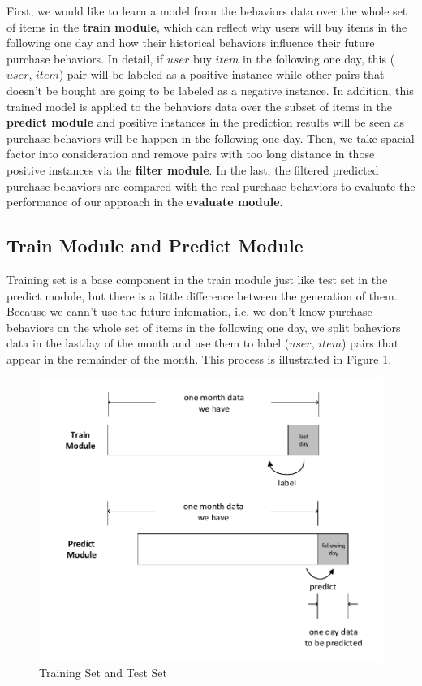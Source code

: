 \documentclass{llncs}
\begin{document}
First, we would like to learn a model from
the behaviors data over the whole set of items in the \textbf{train module},
which can reflect why users will buy items in the following one day
and how their historical behaviors influence their future purchase behaviors.
In detail, if $user$ buy $item$ in the following one day,
this ($user$, $item$) pair will be labeled as a positive instance
while other pairs that doesn't be bought
are going to be labeled as a negative instance.
In addition, this trained model is applied to the behaviors data over
the subset of items in the \textbf{predict module}
and positive instances in the prediction results will be seen as
purchase behaviors will be happen in the following one day.
Then, we take spacial factor into consideration and remove pairs
with too long distance in those positive instances
via the \textbf{filter module}.
In the last, the filtered predicted purchase behaviors are
compared with the real purchase behaviors to evaluate
the performance of our approach in the \textbf{evaluate module}.

\subsection{Train Module and Predict Module}
Training set is a base component in the train module just like
test set in the predict module,
but there is a little difference between the generation of them.
Because we cann't use the future infomation,
i.e. we don't know purchase behaviors
on the whole set of items in the following one day,
we split baheviors data in the lastday of the month
and use them to label ($user$, $item$) pairs that appear
in the remainder of the month.
This process is illustrated in Figure \ref{fig:train_and_test}.

\begin{figure}[htbp]
	\centering
	\includegraphics[scale=0.6]{images/train_and_test.pdf}
	\caption{Training Set and Test Set}
	\label{fig:train_and_test}
\end{figure}
\end{document}
